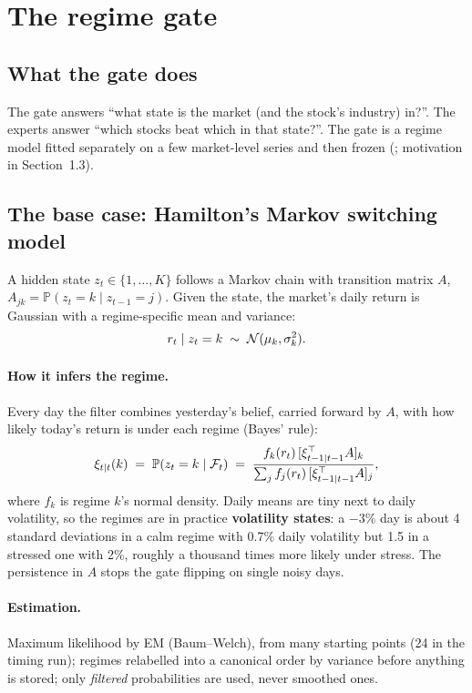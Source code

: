 \section{The regime gate}
\label{sec:gate}

\subsection{What the gate does}

The gate answers ``what state is the market (and the stock's industry) in?''. The experts answer
``which stocks beat which in that state?''. The gate is a regime model fitted separately on a few
market-level series and then frozen (; motivation in Section~1.3).

\subsection{The base case: Hamilton's Markov switching model}

A hidden state $z_t\in\{1,\dots,K\}$ follows a Markov chain with transition matrix $A$,
$A_{jk}=\mathbb P(z_t=k\mid z_{t-1}=j)$. Given the state, the market's daily return is Gaussian with a
regime-specific mean and variance:
\begin{equation}
r_t\mid z_t=k\;\sim\;\mathcal{N}(\mu_k,\sigma_k^2).
\end{equation}

\paragraph{How it infers the regime.} Every day the filter combines yesterday's belief, carried forward by
$A$, with how likely today's return is under each regime (Bayes' rule):
\begin{equation}
\xi_{t\mid t}(k)\;=\;\mathbb P(z_t=k\mid\mathcal{F}_t)\;=\;
\frac{f_k(r_t)\,[\xi_{t-1\mid t-1}^{\top} A]_k}{\sum_j f_j(r_t)\,[\xi_{t-1\mid t-1}^{\top} A]_j},
\end{equation}
where $f_k$ is regime $k$'s normal density. Daily means are tiny next to daily volatility, so the regimes
are in practice \textbf{volatility states}: a $-3\%$ day is about 4 standard deviations in a calm regime with
0.7\% daily volatility but 1.5 in a stressed one with 2\%, roughly a thousand times more likely under
stress. The persistence in $A$ stops the gate flipping on single noisy days.

\paragraph{Estimation.} Maximum likelihood by EM (Baum--Welch), from many starting points (24 in the timing
run); regimes relabelled into a canonical order by variance before anything is stored; only \emph{filtered}
probabilities are used, never smoothed ones.

